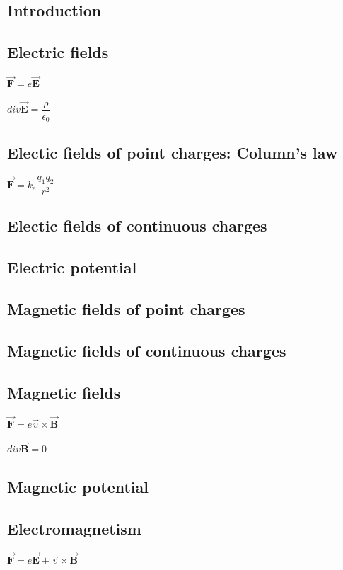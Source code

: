 
\subsection{Introduction}

\subsection{Electric fields}
\(\overrightarrow{\mathbf F} = e\overrightarrow{\mathbf E}\)

\(div \overrightarrow{\mathbf E}=\dfrac{\rho}{\epsilon_0}\)

\subsection{Electic fields of point charges: Column's law}

\(\overrightarrow{\mathbf F}=k_e\dfrac{q_1q_2}{r^2}\)

\subsection{Electic fields of continuous charges}

\subsection{Electric potential}

\subsection{Magnetic fields of point charges}

\subsection{Magnetic fields of continuous charges}

\subsection{Magnetic fields}

\(\overrightarrow{\mathbf F} = e\overrightarrow{v}\times \overrightarrow{\mathbf B}\)


\(div \overrightarrow{\mathbf B}=0\)


\subsection{Magnetic potential}

\subsection{Electromagnetism}


\(\overrightarrow{\mathbf F} = e{\overrightarrow{\mathbf E}+\overrightarrow{v}\times \overrightarrow{\mathbf B}}\)

